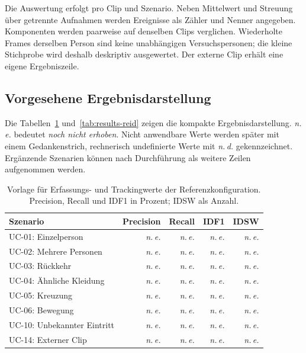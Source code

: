 \documentclass[runningheads]{llncs}
\newcommand{\evalpending}{\textit{n.\,e.}}
\begin{document}
Die Auswertung erfolgt pro Clip und Szenario. Neben Mittelwert und Streuung über getrennte Aufnahmen werden Ereignisse als Zähler und Nenner angegeben. Komponenten werden paarweise auf denselben Clips verglichen. Wiederholte Frames derselben Person sind keine unabhängigen Versuchspersonen; die kleine Stichprobe wird deshalb deskriptiv ausgewertet. Der externe Clip erhält eine eigene Ergebniszeile.

\subsection{Vorgesehene Ergebnisdarstellung}

Die Tabellen~\ref{tab:results-quality} und~\ref{tab:results-reid} zeigen die kompakte Ergebnisdarstellung. \evalpending{} bedeutet \emph{noch nicht erhoben}. Nicht anwendbare Werte werden später mit einem Gedankenstrich, rechnerisch undefinierte Werte mit \emph{n.\,d.} gekennzeichnet. Ergänzende Szenarien können nach Durchführung als weitere Zeilen aufgenommen werden.

\begin{table}[tbp]
\caption{Vorlage für Erfassungs- und Trackingwerte der Referenzkonfiguration. Precision, Recall und IDF1 in Prozent; IDSW als Anzahl.}
\label{tab:results-quality}
\centering
\small
\begin{tabularx}{\linewidth}{@{}Xrrrr@{}}
\toprule
Szenario & Precision & Recall & IDF1 & IDSW \\
\midrule
UC-01: Einzelperson & \evalpending & \evalpending & \evalpending & \evalpending \\
UC-02: Mehrere Personen & \evalpending & \evalpending & \evalpending & \evalpending \\
UC-03: Rückkehr & \evalpending & \evalpending & \evalpending & \evalpending \\
UC-04: Ähnliche Kleidung & \evalpending & \evalpending & \evalpending & \evalpending \\
UC-05: Kreuzung & \evalpending & \evalpending & \evalpending & \evalpending \\
UC-06: Bewegung & \evalpending & \evalpending & \evalpending & \evalpending \\
UC-10: Unbekannter Eintritt & \evalpending & \evalpending & \evalpending & \evalpending \\
UC-14: Externer Clip & \evalpending & \evalpending & \evalpending & \evalpending \\
\bottomrule
\end{tabularx}
\end{table}
\end{document}
